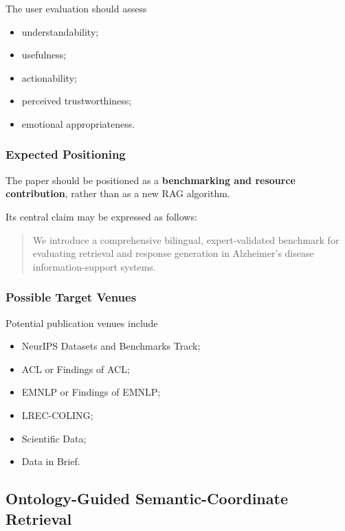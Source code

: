 \documentclass{article}
\begin{document}
The user evaluation should assess
\begin{itemize}
    \item understandability;
    \item usefulness;
    \item actionability;
    \item perceived trustworthiness;
    \item emotional appropriateness.
\end{itemize}

\subsubsection{Expected Positioning}

The paper should be positioned as a \textbf{benchmarking and resource contribution}, rather than as a new RAG algorithm.

Its central claim may be expressed as follows:
\begin{quote}
We introduce a comprehensive bilingual, expert-validated benchmark for
evaluating retrieval and response generation in Alzheimer's disease
information-support systems.
\end{quote}

\subsubsection{Possible Target Venues}

Potential publication venues include
\begin{itemize}
    \item NeurIPS Datasets and Benchmarks Track;
    \item ACL or Findings of ACL;
    \item EMNLP or Findings of EMNLP;
    \item LREC-COLING;
    \item Scientific Data;
    \item Data in Brief.
\end{itemize}

\subsection{Ontology-Guided Semantic-Coordinate Retrieval}

\end{document}
